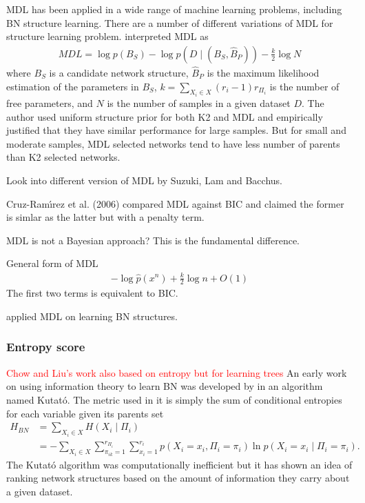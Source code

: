 MDL has been applied in a wide range of machine learning problems, including BN structure learning. There are a number of different variations of MDL for structure learning problem. \cite{bouckaert1994properties} interpreted MDL as 
\begin{align*}
MDL = \log p(B_S) - \log p(D \mid (B_S, \hat{B}_P)) - \frac{k}{2} \log N
\end{align*}
where $B_S$ is a candidate network structure, $\hat{B}_P$ is the maximum likelihood estimation of the parameters in $B_S$, $k=\sum_{X_i \in X} (r_i-1)r_{\Pi_i}$ is the number of free parameters, and $N$ is the number of samples in a given dataset $D$. The author used uniform structure prior for both K2 and MDL and empirically justified that they have similar performance for large samples. But for small and moderate samples, MDL selected networks tend to have less number of parents than K2 selected networks. 

\cite{cruz2006good} 

Look into different version of MDL by Suzuki, Lam and Bacchus. 

Cruz-Ramı́rez et al. (2006) compared MDL against BIC and claimed the former is simlar as the latter but with a penalty term. 

MDL is not a Bayesian approach? This is the fundamental difference. 

General form of MDL 
\begin{align*}
-\log \hat{p}(x^n) + \frac{k}{2}\log n + O(1)
\end{align*}
The first two terms is equivalent to BIC. 

\cite{lam1994learning} applied MDL on learning BN structures. 

\subsubsection{Entropy score}
\textcolor{red}{Chow and Liu's work also based on entropy but for learning trees} An early work on using information theory to learn BN was developed by \cite{herskovits1990entropy} in an algorithm named Kutat\'{o}. The metric used in it is simply the sum of conditional entropies for each variable given its parents set
\begin{align}
\label{eq:herskovitsentropy}
H_{BN} &= \sum_{X_i \in X} H(X_i \mid \Pi_i) \nonumber \\
&= -\sum_{X_i \in X} \sum_{\pi_{ik}=1}^{r_{\Pi_i}} \sum_{x_i = 1}^{r_i} p(X_i = x_i, \Pi_i = \pi_i) \ln p(X_i =x_i \mid \Pi_i = \pi_i).
\end{align}
The Kutat\'{o} algorithm was computationally inefficient but it has shown an idea of ranking network structures based on the amount of information they carry about a given dataset. 


